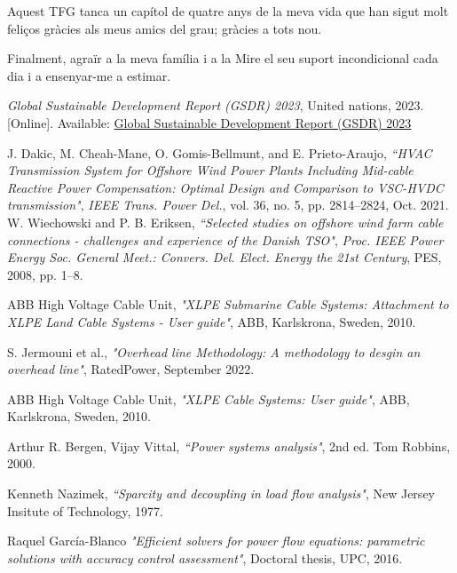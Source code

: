 \documentclass[a4paper,11pt, titlepage, twoside]{article}
\begin{document}
Aquest TFG tanca un capítol de quatre anys de la meva vida que han sigut molt feliços gràcies als meus amics del grau; gràcies a tots nou.\par 
Finalment, agraïr a la meva família i a la Mire el seu suport incondicional cada dia i a ensenyar-me a estimar.
 
 \begin{thebibliography}{99}\label{biblio}
 

 \textit{Global Sustainable Development Report (GSDR) 2023}, United nations, 2023. [Online]. 
 Available: \href{https://sdgs.un.org/gsdr/gsdr2023}{Global Sustainable Development Report (GSDR) 2023}
 
 {J. Dakic, M. Cheah-Mane, O. Gomis-Bellmunt, and E. Prieto-Araujo},
\textit{“HVAC Transmission System for Offshore Wind Power Plants Including
 Mid-cable Reactive Power Compensation: Optimal Design and Comparison to VSC-HVDC transmission"}, \textit{IEEE Trans. Power Del.}, vol. 36,
 no. 5, pp. 2814–2824, Oct. 2021.
 {W. Wiechowski and P. B. Eriksen},
\textit{“Selected studies on offshore wind farm
cable connections - challenges and experience of the Danish TSO"}, \textit{Proc.
IEEE Power Energy Soc. General Meet.: Convers. Del. Elect. Energy the
21st Century}, PES, 2008, pp. 1–8.

{ABB High Voltage Cable Unit},
\textit{"XLPE Submarine Cable Systems: Attachment to XLPE Land Cable Systems - User guide"}, ABB, Karlskrona, Sweden, 2010.


{S. Jermouni et al.},
\textit{"Overhead line Methodology: A methodology to desgin an overhead line"}, RatedPower, September 2022.

{ABB High Voltage Cable Unit},
\textit{"XLPE Cable Systems: User guide"}, ABB, Karlskrona, Sweden, 2010.


 {Arthur R. Bergen, Vijay Vittal},
\textit{“Power systems analysis"}, 2nd ed. Tom Robbins, 2000.

{Kenneth Nazimek},
\textit{“Sparcity and decoupling in load flow analysis"}, New Jersey Insitute of Technology, 1977.

{ Raquel García-Blanco}
\textit{"Efficient solvers for power flow equations: parametric solutions with accuracy control assessment"}, Doctoral thesis, UPC, 2016.



\end{thebibliography}
\end{document}

